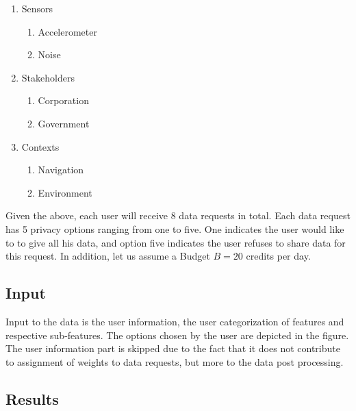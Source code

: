 \begin{enumerate}
    \item Sensors
    \begin{enumerate}
    \item Accelerometer
    \item Noise
   \end{enumerate}
    \item Stakeholders
    \begin{enumerate}
    \item Corporation
    \item Government
   \end{enumerate}
   \item Contexts
    \begin{enumerate}
    \item Navigation
    \item Environment
   \end{enumerate}
 \end{enumerate}
 
Given the above, each user will receive 8 data requests in total. Each data request has 5 privacy options ranging from one to five. One indicates the user would like to to give all his data, and option five indicates the user refuses to share data for this request. In addition, let us
assume a Budget $B=20$ credits per day.
 
\subsection{Input} 
Input to the data is the user information, the user categorization of features and respective sub-features.
The options chosen by the user are depicted in the figure. The user information part is skipped due to the fact that it does not contribute
to assignment of weights to data requests, but more to the data post processing.

\subsection{Results}











